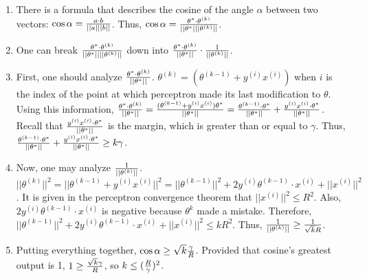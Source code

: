 \documentclass{article}
\begin{document}
    \begin{enumerate}
        \item There is a formula that describes the cosine of the angle $\alpha$ between two vectors: $\cos{\alpha}={{a\cdot{b}}\over{||a|||b||}}$. Thus, $\cos{\alpha}={{\theta^*\cdot\theta^{(k)}}\over{||\theta^*|||\theta^{(k)}||}}$. 
        \item One can break ${{\theta^*\cdot\theta^{(k)}}\over{||\theta^*||||\theta^{(k)}||}}$ down into ${{\theta^*\cdot\theta^{(k)}}\over{||\theta^*||}}\cdot{1\over{||\theta^{(k)}||}}$. 
        \item First, one should analyze ${{\theta^*\cdot\theta^{(k)}}\over{||\theta^*||}}$. $\theta^{(k)}=(\theta^{(k-1)}+y^{(i)}x^{(i)})$ when $i$ is the index of the point at which perceptron made its last modification to $\theta$. Using this information, ${{\theta^*\cdot\theta^{(k)}}\over{||\theta^*||}}={{(\theta^{(k-1)}+y^{(i)}x^{(i)})\theta^*}\over{||\theta^*||}}={{\theta^{(k-1)}\cdot\theta^*}\over{||\theta^*||}}+{{y^{(i)}x^{(i)}\cdot\theta^*}\over{||\theta^*||}}$. Recall that ${{y^{(i)}x^{(i)}\cdot\theta^*}\over{||\theta^*||}}$ is the margin, which is greater than or equal to $\gamma$. Thus, ${{\theta^{(k-1)}\cdot\theta^*}\over{||\theta^*||}}+{{y^{(i)}x^{(i)}\cdot\theta^*}\over{||\theta^*||}}\geq{k\gamma}$. 
        \item Now, one may analyze ${1}\over{||\theta^{(k)}||}$. $||\theta^{(k)}||^2 = ||\theta^{(k-1)}+y^{(i)}x^{(i)}||^2=||\theta^{(k-1)}||^2+2y^{(i)}\theta^{(k-1)}\cdot{x^{(i)}}+||x^{(i)}||^2$. It is given in the perceptron convergence theorem that $||x^{(i)}||^2 \leq R^2$. Also, $2y^{(i)}\theta^{(k-1)}\cdot{x^{(i)}}$ is negative because $\theta^{k}$ made a mistake. Therefore, $||\theta^{(k-1)}||^2+2y^{(i)}\theta^{(k-1)}\cdot{x^{(i)}}+||x^{(i)}||^2\leq{kR^2}$. Thus, ${1\over||\theta^{(k)}||}\geq{1\over{\sqrt{k}R}}$. 
        \item Putting everything together, $\cos{\alpha} \geq {\sqrt{k}}{{\gamma}\over{R}}$. Provided that cosine's greatest output is 1, $1\geq{{\sqrt{k}\gamma}\over{R}}$, so $k\leq{({{R}\over{\gamma}})^2}$. 
         
    \end{enumerate}
        
    
\end{document}
